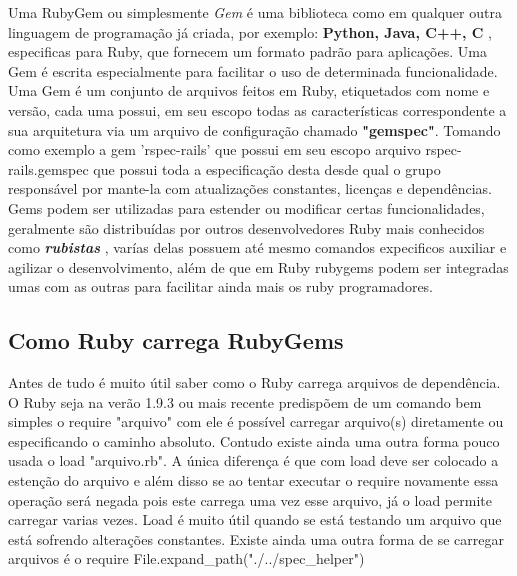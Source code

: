 Uma RubyGem ou simplesmente \textit{Gem} é uma biblioteca como em qualquer outra linguagem de programação já criada, por exemplo: \textbf{ Python, Java, C++, C }, especificas  para  Ruby, que fornecem um formato padrão para aplicações. Uma Gem é escrita especialmente para facilitar o uso de determinada funcionalidade. Uma Gem é um conjunto de arquivos feitos em Ruby, etiquetados com nome e versão, cada uma possui, em seu escopo todas as características correspondente a sua arquitetura via um arquivo de configuração chamado \textbf{"gemspec"}. Tomando como exemplo a gem 'rspec-rails' que possui em seu escopo  arquivo rspec-rails.gemspec que possui toda a especificação desta desde qual o grupo responsável por mante-la com atualizações constantes, licenças e dependências. Gems podem ser utilizadas para estender ou modificar certas funcionalidades, geralmente são distribuídas por outros desenvolvedores Ruby mais conhecidos como \textbf{ \textit{ rubistas } }, varías delas possuem até mesmo comandos expecificos auxiliar e agilizar o desenvolvimento, além de que em Ruby rubygems podem ser integradas umas com as outras para facilitar ainda mais os ruby programadores.

\subsection{Como Ruby carrega RubyGems}
\label{Ruby}

Antes de tudo é  muito útil saber como o Ruby carrega arquivos de dependência. O Ruby seja na verão 1.9.3 ou mais recente predispõem de um comando bem simples o require "arquivo" com ele é possível carregar arquivo(s) diretamente ou especificando o caminho absoluto. Contudo existe ainda uma outra forma pouco usada o load "arquivo.rb". A única diferença é que com load deve ser colocado a estenção do arquivo e além disso se ao tentar executar o require novamente essa operação será negada pois este carrega uma vez esse arquivo, já o load permite carregar varias vezes. Load é muito útil quando se está testando um arquivo que está sofrendo alterações constantes. Existe ainda uma outra forma de se carregar arquivos é o require File.expand\_path("./../spec\_helper")                                                                                                                                                                                                                                                                                                                                                                                                                                                                                                                                                                   

